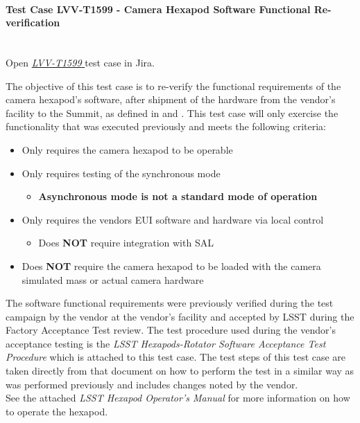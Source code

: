 \documentclass[SE,lsstdraft,STR,toc]{lsstdoc}
\providecommand{\tightlist}{
  \setlength{\itemsep}{0pt}\setlength{\parskip}{0pt}}
\begin{document}
\paragraph{Test Case LVV-T1599 - Camera Hexapod Software Functional Re-verification }\mbox{}\\

Open  \href{https://jira.lsstcorp.org/secure/Tests.jspa#/testCase/LVV-T1599}{\textit{ LVV-T1599 } }
test case in Jira.

The objective of this test case is to re-verify the functional
requirements of the camera hexapod's software, after shipment of the
hardware from the vendor's facility to the Summit, as defined in 
and . This test case will only exercise the functionality that
was executed previously and meets the following criteria:

\begin{itemize}
\tightlist
\item
  Only requires the camera hexapod to be operable
\item
  Only requires testing of the synchronous mode

  \begin{itemize}
  \tightlist
  \item
    \textbf{Asynchronous mode is not a standard mode of operation}
  \end{itemize}
\item
  Only requires the vendors EUI software and hardware via local control

  \begin{itemize}
  \tightlist
  \item
    Does \textbf{NOT} require integration with SAL
  \end{itemize}
\item
  Does \textbf{NOT} require the camera hexapod to be loaded with the
  camera simulated mass or actual camera hardware
\end{itemize}

The software functional requirements were previously verified during the
test campaign by the vendor at the vendor's facility and accepted by
LSST during the Factory Acceptance Test review. The test procedure used
during the vendor's acceptance testing is the \emph{LSST
Hexapods-Rotator Software Acceptance Test Procedure} which is attached
to this test case. The test steps of this test case are taken directly
from that document on how to perform the test in a similar way as was
performed previously and includes changes noted by the
vendor.\\[2\baselineskip]See the attached \emph{LSST Hexapod Operator's
Manual} for more information on how to operate the hexapod.
\end{document}
